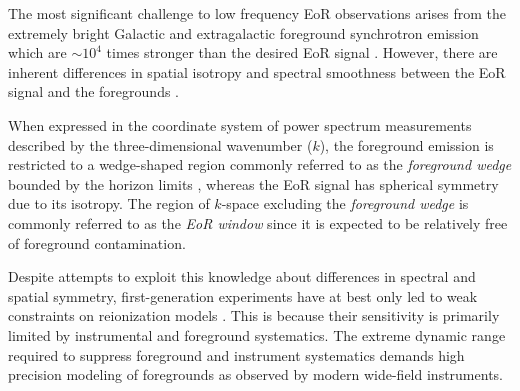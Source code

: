 \documentclass[preprint2,iop,numberedappendix,twocolappendix,appendixfloats]{emulateapj}
\begin{document}
The most significant challenge to low frequency EoR observations arises from the extremely bright Galactic and extragalactic foreground synchrotron emission which are $\sim 10^4$ times stronger than the desired EoR signal \citep{dim02,ali08,ber09,ber10,gho12}. However, there are inherent differences in spatial isotropy and spectral smoothness between the EoR signal and the foregrounds \citep[see, e.g.,][]{fur04b,mor04,zal04,san05,fur06,mcq06,mor06,wan06,gle08}. %

When expressed in the coordinate system of power spectrum measurements described by the three-dimensional wavenumber ($k$), the foreground emission is restricted to a wedge-shaped region commonly referred to as the {\it foreground wedge} \citep{bow09,liu09,liu14a,liu14b,dat10,liu11,gho12,mor12,par12b,tro12,ved12,dil13,pob13,thy13,dil14} bounded by the horizon limits \citep{par12b}, whereas the EoR signal has spherical symmetry due to its isotropy. %
The region of $k$-space excluding the {\it foreground wedge} is commonly referred to as the {\it EoR window} since it is expected to be relatively free of foreground contamination.

Despite attempts to exploit this knowledge about differences in spectral and spatial symmetry, first-generation experiments have at best only led to weak constraints on reionization models \citep{ali15,dil15,pob15}. This is because their sensitivity is primarily limited by instrumental and foreground systematics. The extreme dynamic range required to suppress foreground and instrument systematics demands high precision modeling of foregrounds as observed by modern wide-field instruments. 

\end{document}
